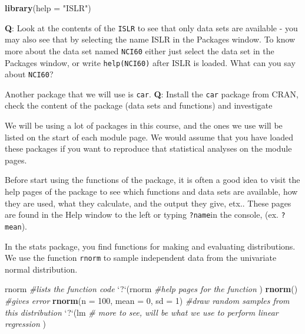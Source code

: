 \documentclass[]{article}
\newenvironment{Shaded}{\begin{snugshade}}{\end{snugshade}}
\newcommand{\KeywordTok}[1]{\textcolor[rgb]{0.13,0.29,0.53}{\textbf{#1}}}
\newcommand{\DataTypeTok}[1]{\textcolor[rgb]{0.13,0.29,0.53}{#1}}
\newcommand{\DecValTok}[1]{\textcolor[rgb]{0.00,0.00,0.81}{#1}}
\newcommand{\StringTok}[1]{\textcolor[rgb]{0.31,0.60,0.02}{#1}}
\newcommand{\CommentTok}[1]{\textcolor[rgb]{0.56,0.35,0.01}{\textit{#1}}}
\newcommand{\NormalTok}[1]{#1}
\begin{document}
\begin{Shaded}
\begin{Highlighting}[]
\KeywordTok{library}\NormalTok{(}\DataTypeTok{help =} \StringTok{"ISLR"}\NormalTok{)}
\end{Highlighting}
\end{Shaded}

\textbf{Q}: Look at the contents of the \texttt{ISLR} to see that only
data sets are available - you may also see that by selecting the name
ISLR in the Packages window. To know more about the data set named
\texttt{NCI60} either just select the data set in the Packages window,
or write \texttt{help(NCI60)} after ISLR is loaded. What can you say
about \texttt{NCI60}?

Another package that we will use is \texttt{car}. \textbf{Q}: Install
the \texttt{car} package from CRAN, check the content of the package
(data sets and functions) and investigate

We will be using a lot of packages in this course, and the ones we use
will be listed on the start of each module page. We would assume that
you have loaded these packages if you want to reproduce that statistical
analyses on the module pages.

Before start using the functions of the package, it is often a good idea
to visit the help pages of the package to see which functions and data
sets are available, how they are used, what they calculate, and the
output they give, etx.. These pages are found in the Help window to the
left or typing \texttt{?name}in the console, (ex. \texttt{?mean}).

In the stats package, you find functions for making and evaluating
distributions. We use the function \texttt{rnorm} to sample independent
data from the univariate normal distribution.

\begin{Shaded}
\begin{Highlighting}[]
\NormalTok{rnorm  }\CommentTok{#lists the function code}
\StringTok{`}\DataTypeTok{?}\StringTok{`}\NormalTok{(rnorm  }\CommentTok{#help pages for the function}
\NormalTok{)}
\KeywordTok{rnorm}\NormalTok{()  }\CommentTok{#gives error}
\KeywordTok{rnorm}\NormalTok{(}\DataTypeTok{n =} \DecValTok{100}\NormalTok{, }\DataTypeTok{mean =} \DecValTok{0}\NormalTok{, }\DataTypeTok{sd =} \DecValTok{1}\NormalTok{)  }\CommentTok{#draw random samples from this distribution}
\StringTok{`}\DataTypeTok{?}\StringTok{`}\NormalTok{(lm  }\CommentTok{# more to see, will be what we use to perform linear regression}
\NormalTok{)}
\end{Highlighting}
\end{Shaded}
\end{document}
